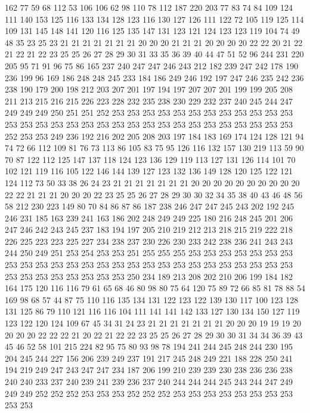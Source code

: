 162 77 59 68 112 53 106 106 62 98 110 78 112 187 220 203 77 83 74 84
109 124 111 140 153 125 116 133 134 128 123 116 130 127 126 111 122 72 105 119
125 114 109 131 145 148 141 120 116 125 135 147 131 123 121 124 123 123 119 104
74 49 48 35 23 25 23 21 21 21 21 21 21 21 20 20 20 21 21 21
20 20 20 20 22 22 20 21 22 21 22 21 22 23 25 25 26 27 28 29
30 31 33 35 36 39 40 44 47 51 52 96 244 231 220 205 95 71 91 96
75 86 165 237 240 247 247 246 243 212 182 239 247 242 178 190 236 199 96 169
186 248 248 245 233 184 186 249 246 192 197 247 246 235 242 236 238 190 179 200
198 212 203 207 201 197 194 197 207 207 201 199 199 205 208 211 213 215 216 215
226 223 228 232 235 238 230 229 232 237 240 245 244 247 249 249 249 250 251 251
252 253 253 253 253 253 253 253 253 253 253 253 253 253 253 253 253 253 253 253
253 253 253 253 253 253 253 253 253 253 253 253 252 253 253 249 236 192 216 202
205 208 203 197 184 183 169 174 124 128 121 94 74 72 66 112 109 81 76 73
113 86 105 83 75 95 126 116 132 157 130 219 113 59 90 70 87 122 112 125
147 137 118 124 123 136 129 119 113 127 131 126 114 101 70 102 121 119 116 105
122 146 144 139 127 123 132 136 149 128 120 125 122 121 124 112 73 50 33 38
26 24 23 21 21 21 21 21 21 21 20 20 20 20 20 20 20 20 20 20
22 22 21 21 21 20 20 20 22 23 25 25 26 27 28 29 30 30 32 34
35 38 40 43 46 48 56 58 212 230 223 149 80 70 84 86 87 86 187 238
246 247 247 245 243 202 192 245 246 231 185 163 239 241 163 186 202 248 249 249
225 180 216 248 245 201 206 247 246 242 243 245 237 183 194 197 205 210 219 212
213 218 215 219 222 218 226 225 223 223 225 227 234 238 237 230 226 230 233 242
238 236 241 243 243 244 250 249 251 253 254 253 253 251 255 255 255 253 253 253
253 253 253 253 253 253 253 253 253 253 253 253 253 253 253 253 253 253 253 253
253 253 253 253 253 253 253 253 253 253 253 250 234 189 213 208 202 210 206 199
184 182 164 175 120 116 116 79 61 65 68 46 80 98 80 75 64 120 75 89
72 66 85 81 78 88 54 169 98 68 57 44 87 75 110 116 135 134 131 122
123 122 139 130 117 100 123 128 131 125 86 79 110 121 116 116 104 111 141 141
142 133 127 130 134 150 127 119 123 122 120 124 109 67 45 34 31 24 23 21
21 21 21 21 21 21 20 20 20 19 19 19 20 20 20 20 22 22 22 21
20 22 21 22 22 23 25 25 26 27 28 29 30 30 31 34 34 36 39 43
45 46 52 58 101 215 224 82 95 75 80 93 98 78 194 241 244 245 248 244
230 195 204 245 244 227 156 206 239 249 237 191 217 245 248 249 221 188 228 250
241 194 219 249 247 243 247 247 234 187 206 199 210 239 239 230 238 236 236 238
240 240 233 237 240 239 241 239 236 237 240 244 244 244 245 243 244 247 249 249
249 252 252 252 253 253 253 252 252 252 253 253 253 253 253 253 253 253 253 253
